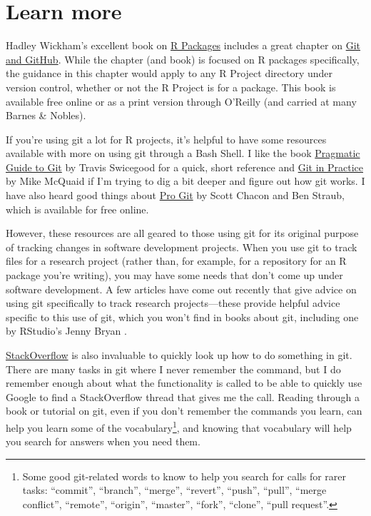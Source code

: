\documentclass[]{tufte-book}
\begin{document}
\hypertarget{learn-more-1}{%
\section{Learn more}\label{learn-more-1}}

Hadley Wickham's excellent book on \href{http://r-pkgs.had.co.nz/}{R Packages} includes a great
chapter on \href{http://r-pkgs.had.co.nz/git.html}{Git and GitHub}. While the chapter (and book) is
focused on R packages specifically, the guidance in this chapter would apply to any
R Project directory under version control, whether or not the R Project is for a package.
This book is available free online or as a print version through O'Reilly (and
carried at many Barnes \& Nobles).

If you're using git a lot for R projects, it's helpful to have some resources available with
more on using git through a Bash Shell. I like the book \href{https://www.amazon.com/Pragmatic-Guide-Git-Programmers/dp/1934356727/ref=sr_1_28?keywords=git\&qid=1554173700\&s=gateway\&sr=8-28}{Pragmatic Guide to Git} by Travis Swicegood for a quick, short reference and
\href{https://www.amazon.com/Git-Practice-Techniques-Mike-McQuaid/dp/1617291978/ref=sr_1_60?keywords=git\&qid=1554174811\&s=gateway\&sr=8-60}{Git in Practice} by Mike McQuaid if I'm trying to dig a bit deeper
and figure out how git works.
I have also heard good things about \href{https://git-scm.com/book/en/v2}{Pro Git} by Scott Chacon and
Ben Straub, which is available for free online.

However, these resources are all geared to those using git for its original purpose of
tracking changes in software development projects. When you use git to track files for a research
project (rather than, for example, for a repository for an R package you're writing), you
may have some needs that don't come up under software development. A few articles have come
out recently that give advice on using git specifically to track research projects---these provide
helpful advice specific to this use of git, which you won't find in books about git, including
one by RStudio's Jenny Bryan \citep{bryan2018excuse}.

\href{https://stackoverflow.com/}{StackOverflow}
is also invaluable to quickly look up how to do something in git. There are
many tasks in git where I never remember the command, but I do remember enough about what
the functionality is called to be able to quickly use Google to find a StackOverflow thread
that gives me the call. Reading through a book or tutorial on git, even if you don't
remember the commands you learn, can help you learn some of the vocabulary\footnote{Some good git-related
  words to know to help you search for calls for rarer tasks: ``commit'', ``branch'', ``merge'', ``revert'',
  ``push'', ``pull'', ``merge conflict'', ``remote'', ``origin'', ``master'', ``fork'', ``clone'', ``pull request''.},
and knowing that vocabulary will help you search for answers when you need them.
\end{document}
